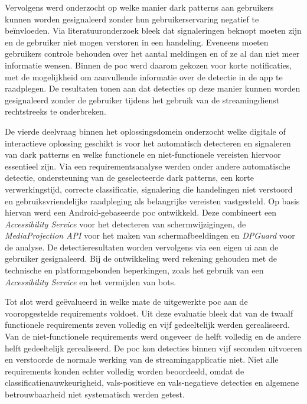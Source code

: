 Vervolgens werd onderzocht op welke manier dark patterns aan gebruikers kunnen worden gesignaleerd zonder hun gebruikerservaring negatief te beïnvloeden. Via literatuuronderzoek bleek dat signaleringen beknopt moeten zijn en de gebruiker niet mogen verstoren in een handeling. Eveneens moeten gebruikers controle behouden over het aantal meldingen en of ze al dan niet meer informatie wensen. Binnen de \acrshort{poc} werd daarom gekozen voor korte notificaties, met de mogelijkheid om aanvullende informatie over de detectie in de app te raadplegen. De resultaten tonen aan dat detecties op deze manier kunnen worden gesignaleerd zonder de gebruiker tijdens het gebruik van de streamingdienst rechtstreeks te onderbreken.

\vspace{1em}

De vierde deelvraag binnen het oplossingsdomein onderzocht welke digitale of interactieve oplossing geschikt is voor het automatisch detecteren en signaleren van dark patterns en welke functionele en niet-functionele vereisten hiervoor essentieel zijn. Via een requirementsanalyse werden onder andere automatische detectie, ondersteuning van de geselecteerde dark patterns, een korte verwerkingstijd, correcte classificatie, signalering die handelingen niet verstoord en gebruiksvriendelijke raadpleging als belangrijke vereisten vastgesteld. Op basis hiervan werd een Android-gebaseerde \acrshort{poc} ontwikkeld. Deze combineert een \textit{Accessibility Service} voor het detecteren van schermwijzigingen, de \textit{MediaProjection API} voor het maken van schermafbeeldingen en \textit{DPGuard} voor de analyse. De detectieresultaten worden vervolgens via een eigen \acrshort{ui} aan de gebruiker gesignaleerd. Bij de ontwikkeling werd rekening gehouden met de technische en platformgebonden beperkingen, zoals het gebruik van een \textit{Accessibility Service} en het vermijden van bots.

\vspace{1em}

Tot slot werd geëvalueerd in welke mate de uitgewerkte \acrshort{poc} aan de vooropgestelde requirements voldoet. Uit deze evaluatie bleek dat van de twaalf functionele requirements zeven volledig en vijf gedeeltelijk werden gerealiseerd. Van de niet-functionele requirements werd ongeveer de helft volledig en de andere helft gedeeltelijk gerealiseerd. De \acrshort{poc} kon detecties binnen vijf seconden uitvoeren en verstoorde de normale werking van de streamingapplicatie niet. Niet alle requirements konden echter volledig worden beoordeeld, omdat de classificatienauwkeurigheid, vals-positieve en vals-negatieve detecties en algemene betrouwbaarheid niet systematisch werden getest.

